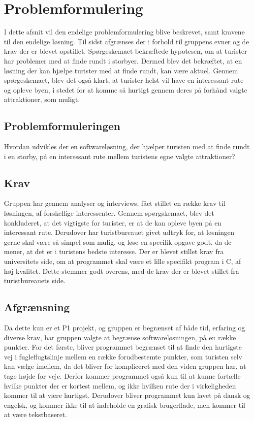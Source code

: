\chapter{Problemformulering}

I dette afsnit vil den endelige problemformulering blive beskrevet, samt kravene til den endelige løsning. Til sidst afgrænses der i forhold til gruppens evner og de krav der er blevet opstillet. 
Spørgeskemaet bekræftede hypotesen, om at turister har problemer med at finde rundt i storbyer. Dermed blev det bekræftet, at en løsning der kan hjælpe turister med at finde rundt, kan være aktuel. Gennem spørgeskemaet, blev det også klart, at turister helst vil have en interessant rute og opleve byen, i stedet for at komme så hurtigt gennem deres på forhånd valgte attraktioner, som muligt. 

\section{Problemformuleringen}
Hvordan udvikles der en softwareløsning, der hjælper turisten med at finde rundt i en storby, på en interessant rute mellem turistens egne valgte attraktioner?

\section{Krav}
Gruppen har gennem analyser og interviews, fået stillet en række krav til løsningen, af forskellige interessenter. 
Gennem spørgskemaet, blev det konkluderet, at det vigtigste for turister, er at de kan opleve byen på en interessant rute. Derudover har turistbureauet givet udtryk for, at løsningen gerne skal være så simpel som mulig, og løse en specifik opgave godt, da de mener, at det er i turistens bedste interesse. \newline
Der er blevet stillet krav fra universitets side, om at programmet skal være et lille specifikt program i C, af høj kvalitet. Dette stemmer godt overens, med de krav der er blevet stillet fra turistbureauets side.  

\section{Afgrænsning}
Da dette kun er et P1 projekt, og gruppen er begrænset af både tid, erfaring og diverse krav, har gruppen valgte at begrænse softwareløsningen, på en række punkter. \newline
For det første, bliver programmet begrænset til at finde den hurtigste vej i fugleflugtslinje mellem en række forudbestemte punkter, som turisten selv kan vælge imellem, da det bliver for kompliceret med den viden gruppen har, at tage højde for veje. Derfor kommer programmet også kun til at kunne fortælle hvilke punkter der er kortest mellem, og ikke hvilken rute der i virkeligheden kommer til at være hurtigst. \newline
Derudover bliver programmet kun lavet på dansk og engelsk, og kommer ikke til at indeholde en grafisk brugerflade, men kommer til at være tekstbaseret.


